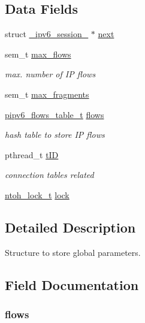 \subsection*{Data Fields}
\begin{DoxyCompactItemize}
\item 
struct \hyperlink{struct__ipv6__session__}{\-\_\-ipv6\-\_\-session\-\_\-} $\ast$ \hyperlink{struct__ipv6__session___ac6d0686c91caf00b0b9eaefd9ec5bfcd}{next}
\item 
sem\-\_\-t \hyperlink{struct__ipv6__session___aba31d11fb16b2f989c42f6433365649e}{max\-\_\-flows}
\begin{DoxyCompactList}\small\item\em max. number of I\-P flows \end{DoxyCompactList}\item 
sem\-\_\-t \hyperlink{struct__ipv6__session___a122dd84b8082b78785803252948a6ad0}{max\-\_\-fragments}
\item 
\hyperlink{ipv6defrag_8h_aa864213ee9a224d009da94990b5ba1d7}{pipv6\-\_\-flows\-\_\-table\-\_\-t} \hyperlink{struct__ipv6__session___aecc3227daff3b4522862be5c7d14a9a5}{flows}
\begin{DoxyCompactList}\small\item\em hash table to store I\-P flows \end{DoxyCompactList}\item 
pthread\-\_\-t \hyperlink{struct__ipv6__session___ab10186c154259d2b4ed2d25b7e23ed17}{t\-I\-D}
\begin{DoxyCompactList}\small\item\em connection tables related \end{DoxyCompactList}\item 
\hyperlink{structntoh__lock__t}{ntoh\-\_\-lock\-\_\-t} \hyperlink{struct__ipv6__session___aad15823e4f2835531e6a02321cd53f7e}{lock}
\end{DoxyCompactItemize}


\subsection{Detailed Description}
Structure to store global parameters. 

\subsection{Field Documentation}
\hypertarget{struct__ipv6__session___aecc3227daff3b4522862be5c7d14a9a5}{
\subsubsection[{flows}]{ flows}}\label{struct__ipv6__session___aecc3227daff3b4522862be5c7d14a9a5}


